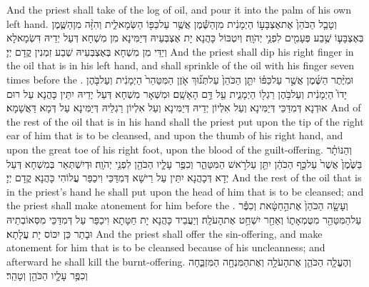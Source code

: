 {And the priest shall take of the log of oil, and pour it into the palm of his own left hand.}{}
{וְטָבַ֤ל הַכֹּהֵן֙ אֶת\maqqaf אֶצְבָּע֣וֹ הַיְמָנִ֔ית מִן\maqqaf הַשֶּׁ֕מֶן אֲשֶׁ֥ר עַל\maqqaf כַּפּ֖וֹ הַשְּׂמָאלִ֑ית וְהִזָּ֨ה מִן\maqqaf הַשֶּׁ֧מֶן בְּאֶצְבָּע֛וֹ שֶׁ֥בַע פְּעָמִ֖ים לִפְנֵ֥י יְהֹוָֽה׃}
{וְיִטְבּוֹל כָּהֲנָא יָת אֶצְבְּעֵיהּ דְּיַמִּינָא מִן מִשְׁחָא דְּעַל יְדֵיהּ דִּשְׂמָאלָא וְיַדֵּי מִן מִשְׁחָא בְּאֶצְבְּעֵיהּ שְׁבַע זִמְנִין קֳדָם יְיָ׃}
{And the priest shall dip his right finger in the oil that is in his left hand, and shall sprinkle of the oil with his finger seven times before the \lord.}{}
{וּמִיֶּ֨תֶר הַשֶּׁ֜מֶן אֲשֶׁ֣ר עַל\maqqaf כַּפּ֗וֹ יִתֵּ֤ן הַכֹּהֵן֙ עַל\maqqaf תְּנ֞וּךְ אֹ֤זֶן הַמִּטַּהֵר֙ הַיְמָנִ֔ית וְעַל\maqqaf בֹּ֤הֶן יָדוֹ֙ הַיְמָנִ֔ית וְעַל\maqqaf בֹּ֥הֶן רַגְל֖וֹ הַיְמָנִ֑ית עַ֖ל דַּ֥ם הָאָשָֽׁם׃}
{וּמִשְּׁאָר מִשְׁחָא דְּעַל יְדֵיהּ יִתֵּין כָּהֲנָא עַל רוּם אוּדְנָא דְּמִדַּכֵּי דְּיַמִּינָא וְעַל אִלְיוֹן יְדֵיהּ דְּיַמִּינָא וְעַל אִלְיוֹן רַגְלֵיהּ דְּיַמִּינָא עַל דְּמָא דַּאֲשָׁמָא׃}
{And of the rest of the oil that is in his hand shall the priest put upon the tip of the right ear of him that is to be cleansed, and upon the thumb of his right hand, and upon the great toe of his right foot, upon the blood of the guilt-offering.}{}
{וְהַנּוֹתָ֗ר בַּשֶּׁ֙מֶן֙ אֲשֶׁר֙ עַל\maqqaf כַּ֣ף הַכֹּהֵ֔ן יִתֵּ֖ן עַל\maqqaf רֹ֣אשׁ הַמִּטַּהֵ֑ר וְכִפֶּ֥ר עָלָ֛יו הַכֹּהֵ֖ן לִפְנֵ֥י יְהֹוָֽה׃}
{וּדְיִשְׁתְּאַר בְּמִשְׁחָא דְּעַל יְדָא דְּכָהֲנָא יִתֵּין עַל רֵישָׁא דְּמִדַּכֵּי וִיכַפַּר עֲלוֹהִי כָּהֲנָא קֳדָם יְיָ׃}
{And the rest of the oil that is in the priest’s hand he shall put upon the head of him that is to be cleansed; and the priest shall make atonement for him before the \lord.}{}
{וְעָשָׂ֤ה הַכֹּהֵן֙ אֶת\maqqaf הַ֣חַטָּ֔את וְכִפֶּ֕ר עַל\maqqaf הַמִּטַּהֵ֖ר מִטֻּמְאָת֑וֹ וְאַחַ֖ר יִשְׁחַ֥ט אֶת\maqqaf הָעֹלָֽה׃}
{וְיַעֲבֵיד כָּהֲנָא יָת חַטָּתָא וִיכַפַּר עַל דְּמִדַּכֵּי מִסְּאוֹבְתֵיהּ וּבָתַר כֵּן יִכּוֹס יָת עֲלָתָא׃}
{And the priest shall offer the sin-offering, and make atonement for him that is to be cleansed because of his uncleanness; and afterward he shall kill the burnt-offering.}{}
{וְהֶעֱלָ֧ה הַכֹּהֵ֛ן אֶת\maqqaf הָעֹלָ֥ה וְאֶת\maqqaf הַמִּנְחָ֖ה הַמִּזְבֵּ֑חָה וְכִפֶּ֥ר עָלָ֛יו הַכֹּהֵ֖ן וְטָהֵֽר׃ \setuma }
